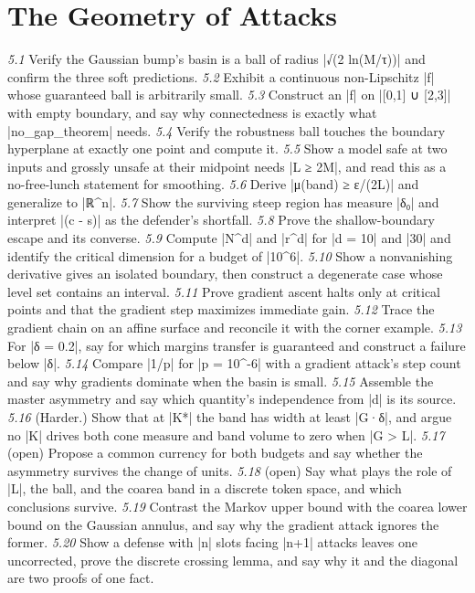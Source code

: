 \documentclass{memoir}
\begin{document}
\section{The Geometry of Attacks}\label{Two--Schemas--of--Impossibility-005F-005F-005F--Machine--Checked--Limits--of--Trustworthy--Machine--Learning-005F-005F-005F--and--Why--They--Tighten--with--Capability----Exercises----The--Geometry--of--Attacks}

\emph{5.1} Verify the Gaussian bump's basin is a ball of radius \LeanVerb|√(2 ln(M/τ))| and confirm
the three soft predictions.
\emph{5.2} Exhibit a continuous non-Lipschitz \LeanVerb|f| whose guaranteed ball is arbitrarily
small.
\emph{5.3} Construct an \LeanVerb|f| on \LeanVerb|[0,1] ∪ [2,3]| with empty boundary, and say why
connectedness is exactly what \LeanVerb|no_gap_theorem| needs.
\emph{5.4} Verify the robustness ball touches the boundary hyperplane at exactly one point
and compute it.
\emph{5.5} Show a model safe at two inputs and grossly unsafe at their midpoint needs
\LeanVerb|L ≥ 2M|, and read this as a no-free-lunch statement for smoothing.
\emph{5.6} Derive \LeanVerb|μ(band) ≥ ε/(2L)| and generalize to \LeanVerb|ℝ^n|.
\emph{5.7} Show the surviving steep region has measure \LeanVerb|δ₀| and interpret \LeanVerb|(c - s)| as the
defender's shortfall.
\emph{5.8} Prove the shallow-boundary escape and its converse.
\emph{5.9} Compute \LeanVerb|N^d| and \LeanVerb|r^d| for \LeanVerb|d = 10| and \LeanVerb|30| and identify the critical
dimension for a budget of \LeanVerb|10^6|.
\emph{5.10} Show a nonvanishing derivative gives an isolated boundary, then construct a
degenerate case whose level set contains an interval.
\emph{5.11} Prove gradient ascent halts only at critical points and that the gradient step
maximizes immediate gain.
\emph{5.12} Trace the gradient chain on an affine surface and reconcile it with the corner
example.
\emph{5.13} For \LeanVerb|δ = 0.2|, say for which margins transfer is guaranteed and construct a
failure below \LeanVerb|δ|.
\emph{5.14} Compare \LeanVerb|1/p| for \LeanVerb|p = 10^-6| with a gradient attack's step count and say why
gradients dominate when the basin is small.
\emph{5.15} Assemble the master asymmetry and say which quantity's independence from \LeanVerb|d| is
its source.
\emph{5.16} (Harder.) Show that at \LeanVerb|K*| the band has width at least \LeanVerb|G·δ|, and argue no \LeanVerb|K|
drives both cone measure and band volume to zero when \LeanVerb|G > L|.
\emph{5.17} (open) Propose a common currency for both budgets and say whether the asymmetry
survives the change of units.
\emph{5.18} (open) Say what plays the role of \LeanVerb|L|, the ball, and the coarea band in a
discrete token space, and which conclusions survive.
\emph{5.19} Contrast the Markov upper bound with the coarea lower bound on the Gaussian
annulus, and say why the gradient attack ignores the former.
\emph{5.20} Show a defense with \LeanVerb|n| slots facing \LeanVerb|n+1| attacks leaves one uncorrected, prove
the discrete crossing lemma, and say why it and the diagonal are two proofs of one
fact.
\end{document}
